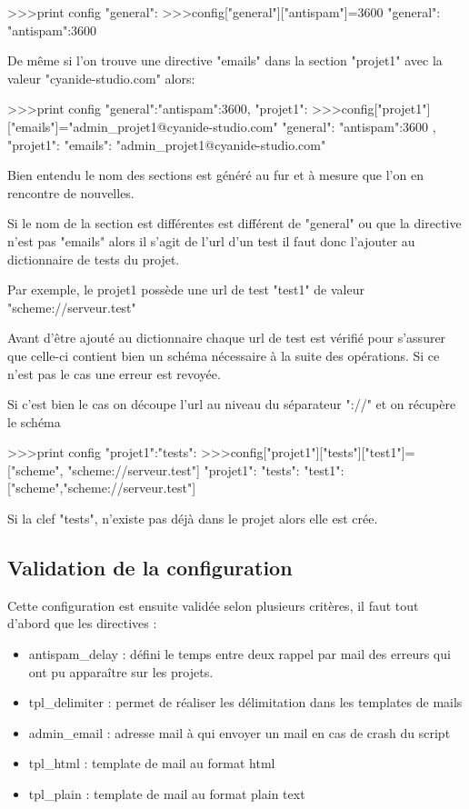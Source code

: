 \begin{python}
>>>print config
{"general":{}}
>>>config["general"]["antispam"]=3600
{
	"general":
	{
		"antispam":3600
	}
}
\end{python}

De même si l'on trouve une directive "emails" dans la section "projet1" avec la valeur "cyanide-studio.com" alors:

\begin{python}
>>>print config
{"general":{"antispam":3600}, "projet1":{}}
>>>config["projet1"]["emails"]="admin_projet1@cyanide-studio.com"
{
	"general":
	{
		"antispam":3600
	},
	"projet1":
	{
		"emails": "admin_projet1@cyanide-studio.com"
	}
}
\end{python}

Bien entendu le nom des sections est généré au fur et à mesure que l'on en rencontre de nouvelles.

Si le nom de la section est différentes est différent de "general" ou que la directive n'est pas "emails" alors il s'agit de l'url d'un test il faut donc l'ajouter au dictionnaire de tests du projet.

Par exemple, le projet1 possède une url de test "test1" de valeur "scheme://serveur.test"

Avant d'être ajouté au dictionnaire chaque url de test est vérifié pour s'assurer que celle-ci contient bien un schéma nécessaire à la suite des opérations. Si ce n'est pas le cas une erreur est revoyée.

Si c'est bien le cas on découpe l'url au niveau du séparateur "://" et on récupère le schéma

\begin{python}
>>>print config
{"projet1":{"tests":{}}}
>>>config["projet1"]["tests"]["test1"]=["scheme", "scheme://serveur.test"]
{
	"projet1":
	{
		"tests":
		{
			"test1":["scheme","scheme://serveur.test"]
		}
	}
}
\end{python}

Si la clef "tests", n'existe pas déjà dans le projet alors elle est crée.


\subsection*{Validation de la configuration}

Cette configuration est ensuite validée selon plusieurs critères, il faut tout d'abord que les directives :

\begin{itemize}
	\item{antispam\_delay} : défini le temps entre deux rappel par mail des erreurs qui ont pu apparaître sur les projets. 
	\item{tpl\_delimiter} : permet de réaliser les délimitation dans les templates de mails 
	\item{admin\_email} : adresse mail à qui envoyer un mail en cas de crash du script
	\item{tpl\_html} : template de mail au format html
	\item{tpl\_plain} : template de mail au format plain text
\end{itemize}

